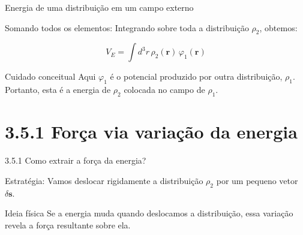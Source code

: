 \documentclass[aspectratio=169,11pt]{beamer}
\begin{document}
\begin{frame}{Energia de uma distribuição em um campo externo}

\begin{mybox}{Somando todos os elementos: }
Integrando sobre toda a distribuição \(\rho_2\), obtemos:
\end{mybox}

\begin{eqbox}
\begin{equation}
V_E = \int d^3r\, \rho_2(\mathbf r)\,\varphi_1(\mathbf r)
\tag{3.64}
\end{equation}
\end{eqbox}

\begin{alertblock}{Cuidado conceitual}
Aqui \(\varphi_1\) é o potencial produzido por outra distribuição, \(\rho_1\).
Portanto, esta é a energia de \(\rho_2\) colocada no campo de \(\rho_1\).
\end{alertblock}

\end{frame}

\section{3.5.1 Força via variação da energia}

\begin{frame}{3.5.1 Como extrair a força da energia?}

\begin{mybox}{Estratégia: }
Vamos deslocar rigidamente a distribuição \(\rho_2\) por um pequeno vetor \(\delta\mathbf{s}\).
\end{mybox}

\begin{center}
\end{center}

\begin{alertblock}{Ideia física}
Se a energia muda quando deslocamos a distribuição, essa variação revela a força resultante sobre ela.
\end{alertblock}

\end{frame}
\end{document}
